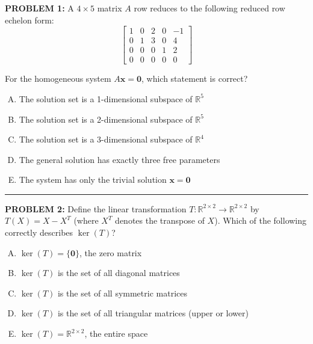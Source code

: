 \documentclass[12pt]{amsart}
\newcommand{\divider}{
  \vspace{-1em} %
  \noindent
  \raisebox{-0.15ex}{\textbullet}%
  \hspace{0.5em}%
  \rule[0.5ex]{0.95\textwidth}{1.0pt}%
  \hspace{0.5em}%
  \raisebox{-0.15ex}{\textbullet}%
  \vspace{0em} %
}
\begin{document}
{\bf PROBLEM 1:}
A $4 \times 5$ matrix $A$ row reduces to the following reduced row echelon form:
$$\begin{bmatrix} 1 & 0 & 2 & 0 & -1 \\ 0 & 1 & 3 & 0 & 4 \\ 0 & 0 & 0 & 1 & 2 \\ 0 & 0 & 0 & 0 & 0 \end{bmatrix}$$

For the homogeneous system $A\mathbf{x} = \mathbf{0}$, which statement is correct?

\begin{enumerate}[(A)]
\item The solution set is a 1-dimensional subspace of $\mathbb{R}^5$
\item The solution set is a 2-dimensional subspace of $\mathbb{R}^5$
\item The solution set is a 3-dimensional subspace of $\mathbb{R}^4$
\item The general solution has exactly three free parameters
\item The system has only the trivial solution $\mathbf{x} = \mathbf{0}$
\end{enumerate}


\divider

{\bf PROBLEM 2:}
Define the linear transformation $T: \mathbb{R}^{2 \times 2} \to \mathbb{R}^{2 \times 2}$ by $T(X) = X - X^T$ (where $X^T$ denotes the transpose of $X$). Which of the following correctly describes $\ker(T)$?

\begin{enumerate}[(A)]
\item $\ker(T) = \{\mathbf{0}\}$, the zero matrix 
\item $\ker(T)$ is the set of all diagonal matrices
\item $\ker(T)$ is the set of all symmetric matrices
\item $\ker(T)$ is the set of all triangular matrices (upper or lower)
\item $\ker(T) = \mathbb{R}^{2 \times 2}$, the entire space
\end{enumerate}
\end{document}
